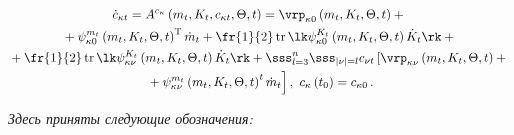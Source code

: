 \begin{multline}

         \dot c_{\kappa t} ={A}^{c_\kappa} \left(m_t, K_t, c_{\kappa t}, \Theta, t\right)=

    \vrp_{\kappa 0} \left(m_t, K_t, \Theta, t\right)+{}\\

{}+

    \psi_{\kappa 0}^{m_t} \left(m_t, K_t, \Theta, t\right)^{\mathrm{T}} \dot m_t 

+ \fr{1}{2} \,\mathrm{tr}\, \lk \psi_{\kappa 0}^{K_t} 

    \left(m_t, K_t, \Theta, t\right) \dot K_t\rk+ {}\\

    {}+\fr{1}{2} \,\mathrm{tr}\, 

    \lk \psi_{\kappa \nu}^{K_t} \left(m_t, K_t, \Theta, t\right) \dot K_t\rk+

\displaystyle \sss_{l=3}^n \sss_{| \nu | =l} c_{\nu t} \left[ \vrp_{\kappa \nu}

\left(m_t, K_t, \Theta, t\right) +{}\right.\\

\left.{}+\psi_{\kappa \nu}^{m_t}

\left(m_t, K_t, \Theta, t\right)^t \dot m_t\right],\  

c_{\kappa} \left(t_0\right) = c_{\kappa 0}\,.

\label{e5.4-s21}

\end{multline}

\textit{Здесь приняты следующие обозначения:}

